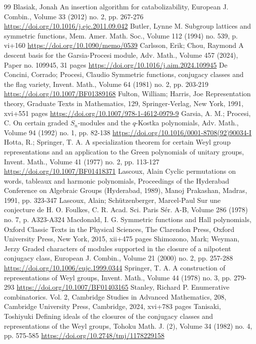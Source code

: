 \begin{thebibliography}{99}
 Blasiak, Jonah An insertion algorithm for catabolizability, European J. Combin., Volume 33 (2012) no. 2, pp. 267-276 \url{https://doi.org/10.1016/j.ejc.2011.09.042}
 Butler, Lynne M. Subgroup lattices and symmetric functions, Mem. Amer. Math. Soc., Volume 112 (1994) no. 539, p. vi+160 \url{https://doi.org/10.1090/memo/0539}
 Carlsson, Erik; Chou, Raymond A descent basis for the Garsia-Procesi module, Adv. Math., Volume 457 (2024), Paper no. 109945, 31 pages \url{https://doi.org/10.1016/j.aim.2024.109945}
 De Concini, Corrado; Procesi, Claudio Symmetric functions, conjugacy classes and the flag variety, Invent. Math., Volume 64 (1981) no. 2, pp. 203-219 \url{https://doi.org/10.1007/BF01389168}
 Fulton, William; Harris, Joe Representation theory, Graduate Texts in Mathematics, 129, Springer-Verlag, New York, 1991, xvi+551 pages \url{https://doi.org/10.1007/978-1-4612-0979-9}
 Garsia, A. M.; Procesi, C. On certain graded ${S}_n$-modules and the $q$-Kostka polynomials, Adv. Math., Volume 94 (1992) no. 1, pp. 82-138 \url{https://doi.org/10.1016/0001-8708(92)90034-I}
 Hotta, R.; Springer, T. A. A specialization theorem for certain Weyl group representations and an application to the Green polynomials of unitary groups, Invent. Math., Volume 41 (1977) no. 2, pp. 113-127 \url{https://doi.org/10.1007/BF01418371}
 Lascoux, Alain Cyclic permutations on words, tableaux and harmonic polynomials, Proceedings of the Hyderabad Conference on Algebraic Groups (Hyderabad, 1989), Manoj Prakashan, Madras, 1991, pp. 323-347
 Lascoux, Alain; Schützenberger, Marcel-Paul Sur une conjecture de H. O. Foulkes, C. R. Acad. Sci. Paris Sér. A-B, Volume 286 (1978) no. 7, p. A323-A324
 Macdonald, I. G. Symmetric functions and Hall polynomials, Oxford Classic Texts in the Physical Sciences, The Clarendon Press, Oxford University Press, New York, 2015, xii+475 pages
 Shimozono, Mark; Weyman, Jerzy Graded characters of modules supported in the closure of a nilpotent conjugacy class, European J. Combin., Volume 21 (2000) no. 2, pp. 257-288 \url{https://doi.org/10.1006/eujc.1999.0344}
 Springer, T. A. A construction of representations of Weyl groups, Invent. Math., Volume 44 (1978) no. 3, pp. 279-293 \url{https://doi.org/10.1007/BF01403165}
 Stanley, Richard P. Enumerative combinatorics. Vol. 2, Cambridge Studies in Advanced Mathematics, 208, Cambridge University Press, Cambridge, 2024, xvi+783 pages
 Tanisaki, Toshiyuki Defining ideals of the closures of the conjugacy classes and representations of the Weyl groups, Tohoku Math. J. (2), Volume 34 (1982) no. 4, pp. 575-585 \url{https://doi.org/10.2748/tmj/1178229158}
\end{thebibliography}

